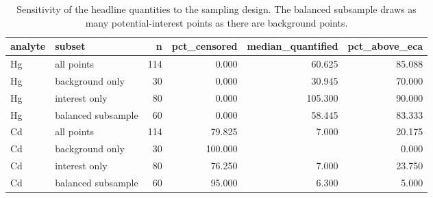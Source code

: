 \begin{table}[htbp]
\centering
\caption{Sensitivity of the headline quantities to the sampling design. The balanced subsample draws as many potential-interest points as there are background points.}
\label{tab:preferential}
\footnotesize
\begin{tabular}{llrrrr}
\toprule
analyte & subset & n & pct\_censored & median\_quantified & pct\_above\_eca \\
\midrule
Hg & all points & 114 & 0.000 & 60.625 & 85.088 \\
Hg & background only & 30 & 0.000 & 30.945 & 70.000 \\
Hg & interest only & 80 & 0.000 & 105.300 & 90.000 \\
Hg & balanced subsample & 60 & 0.000 & 58.445 & 83.333 \\
Cd & all points & 114 & 79.825 & 7.000 & 20.175 \\
Cd & background only & 30 & 100.000 &  & 0.000 \\
Cd & interest only & 80 & 76.250 & 7.000 & 23.750 \\
Cd & balanced subsample & 60 & 95.000 & 6.300 & 5.000 \\
\bottomrule
\end{tabular}
\end{table}
